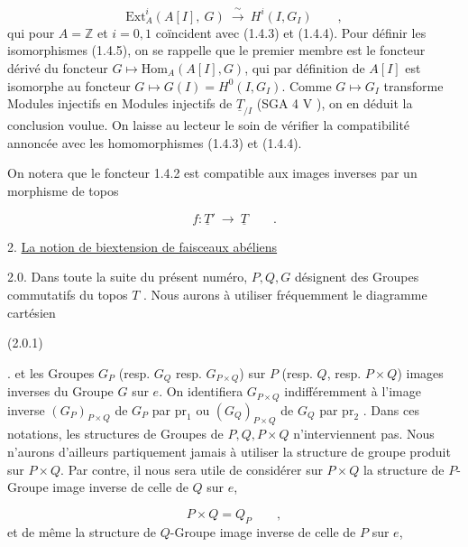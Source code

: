 \begin{equation}\tag{1.4.5}
\mathrm{Ext}^i_A(A[I],\ G) \ \xrightarrow{\ \sim\ }\ H^i(I,G_I) \qquad ,
\end{equation}
qui pour $A=\mathbb{Z}$ et $i=0,1$ coïncident avec (1.4.3) et (1.4.4). Pour définir les isomorphismes (1.4.5), on se rappelle que le premier membre est le foncteur dérivé du foncteur $G \longmapsto \mathrm{Hom}_A(A[I],G)$, qui par définition de $A[I]$ est isomorphe au foncteur $G \longmapsto G(I) = H^0(I,G_I)$. Comme $G \longmapsto G_I$ transforme Modules injectifs en Modules injectifs de $\underline{T}_{/I}$ (SGA 4 V     ), on en déduit la conclusion voulue. On laisse au lecteur le soin de vérifier la compatibilité annoncée avec les homomorphismes (1.4.3) et (1.4.4).

On notera que le foncteur 1.4.2 est compatible aux images inverses par un morphisme de topos

\begin{equation*}
f : \underline{T}' \ \longrightarrow\ \underline{T} \qquad .
\end{equation*}



2. \underline{La notion de biextension  de faisceaux abéliens}

2.0.  Dans toute la suite du présent numéro, $P,Q,G$ désignent des Groupes commutatifs du topos \underline{$T$} . Nous aurons à utiliser fréquemment le diagramme cartésien

(2.0.1)  \qquad .
et les Groupes $G_P$ (resp. $G_Q$ resp. $G_{P\times Q}$) sur $P$ (resp. $Q$, resp. $P\times Q$) images inverses du Groupe $G$ sur $e$. On identifiera $G_{P\times Q}$ indifféremment à l'image inverse $(G_P)_{P\times Q}$ de $G_P$ par $\mathrm{pr}_1$ ou $(G_Q)_{P\times Q}$ de $G_Q$ par $\mathrm{pr}_2$ . Dans ces notations, les structures de Groupes de $P,Q,P\times Q$ n'interviennent pas. Nous n'aurons d'ailleurs partiquement jamais à utiliser la structure de groupe produit sur $P\times Q$. Par contre, il nous sera utile de considérer sur $P\times Q$ la structure de $P$-Groupe image inverse de celle de $Q$ sur $e$,

\begin{equation}\tag{2.0.2}
P\times Q = Q_P \qquad ,
\end{equation}
et de même la structure de $Q$-Groupe image inverse de celle de $P$ sur $e$,

